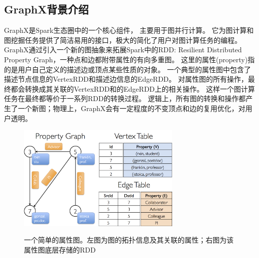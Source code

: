 \documentclass[master]{njuthesis}
\begin{document}
\subsection{GraphX背景介绍}
GraphX\cite{DBLP:conf/osdi/GonzalezXDCFS14}是Spark生态圈中的一个核心组件， 主要用于图并行计算。
它为图计算和图挖掘任务提供了简洁易用的接口，极大的简化了用户对图计算任务的编程。
GraphX通过引入一个新的图抽象来拓展Spark中的RDD: Resilient Distributed Property Graph，一种点和边都附带属性的有向多重图。
这里的属性(property)指的是用户自己定义的描述边或顶点某些性质的对象。
一个典型的属性图中包含了描述节点信息的VertexRDD和描述边信息的EdgeRDD。
对属性图的所有操作，最终都会转换成其关联的VertexRDD和的EdgeRDD上的相关操作。
这样一个图计算任务在最终都等价于一系列RDD的转换过程。
逻辑上，所有图的转换和操作都产生了一个新图；物理上，GraphX会有一定程度的不变顶点和边的复用优化，对用户透明。
\begin{figure}[htbp]
  \centering
  \includegraphics[width= 0.7\textwidth]{figure/property_graph.png}\\
  \caption{一个简单的属性图。左图为图的拓扑信息及其关联的属性；右图为该属性图底层存储的RDD}
  \label{fig:property_graph}
\end{figure}
\end{document}
